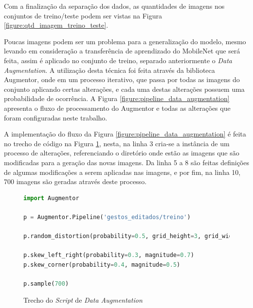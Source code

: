 \par Com a finalização da separação dos dados, as quantidades de imagens nos conjuntos de treino/teste podem ser vistas na Figura \ref{figure:qtd_imagem_treino_teste}.


\par Poucas imagens podem ser um problema para a generalização do modelo, mesmo levando em consideração a transferência de aprendizado do MobileNet que será feita, assim é aplicado no conjunto de treino, separado anteriormente o \textit{Data Augmentation}. A utilização desta técnica foi feita através da biblioteca Augmentor, onde em um processo iterativo, que passa por todas as imagens do conjunto aplicando certas alterações, e cada uma destas alterações possuem uma probabilidade de ocorrência. A Figura \ref{figure:pipeline_data_augmentation} apresenta o fluxo de processamento do Augmentor e todas as alterações que foram configuradas neste trabalho.


\par A implementação do fluxo da Figura \ref{figure:pipeline_data_augmentation} é feita no trecho de código na Figura \ref{figure:dataaugmentation}, nesta, na linha 3 cria-se a instância de um processo de alterações, referenciando o diretório onde estão as imagens que são modificadas para a geração das novas imagens. Da linha 5 a 8 são feitas definições de algumas modificações a serem aplicadas nas imagens, e por fim, na linha 10, 700 imagens são geradas através deste processo.

\begin{figure}[H]
    \centering
    \caption{Trecho do \textit{Script} de \textit{Data Augmentation}}
    \begin{lstlisting}[language=Python]
import Augmentor

p = Augmentor.Pipeline('gestos_editados/treino')

p.random_distortion(probability=0.5, grid_height=3, grid_width=3, magnitude=2)

p.skew_left_right(probability=0.3, magnitude=0.7)
p.skew_corner(probability=0.4, magnitude=0.5)

p.sample(700)
    \end{lstlisting}
    \label{figure:dataaugmentation}
\end{figure}

